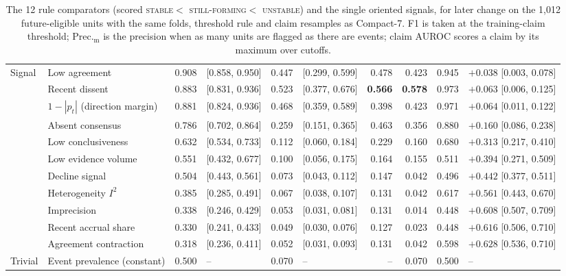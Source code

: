 \documentclass[11pt]{article}
\newcommand{\compact}{Compact-7\xspace}
\newcommand{\stable}{\textsc{stable}\xspace}
\newcommand{\forming}{\textsc{still-forming}\xspace}
\newcommand{\unstable}{\textsc{unstable}\xspace}
\begin{document}
\begin{table}
{\begin{tabular}{@{}llrlrlrrrl@{}}
\midrule
Signal & Low agreement & 0.908 & [0.858, 0.950] & 0.447 & [0.299, 0.599] & 0.478 & 0.423 & 0.945 & $+0.038$ [0.003, 0.078] \\
 & Recent dissent & 0.883 & [0.831, 0.936] & 0.523 & [0.377, 0.676] & \textbf{0.566} & \textbf{0.578} & 0.973 & $+0.063$ [0.006, 0.125] \\
 & $1-|p_t|$ (direction margin) & 0.881 & [0.824, 0.936] & 0.468 & [0.359, 0.589] & 0.398 & 0.423 & 0.971 & $+0.064$ [0.011, 0.122] \\
 & Absent consensus & 0.786 & [0.702, 0.864] & 0.259 & [0.151, 0.365] & 0.463 & 0.356 & 0.880 & $+0.160$ [0.086, 0.238] \\
 & Low conclusiveness & 0.632 & [0.534, 0.733] & 0.112 & [0.060, 0.184] & 0.229 & 0.160 & 0.680 & $+0.313$ [0.217, 0.410] \\
 & Low evidence volume & 0.551 & [0.432, 0.677] & 0.100 & [0.056, 0.175] & 0.164 & 0.155 & 0.511 & $+0.394$ [0.271, 0.509] \\
 & Decline signal & 0.504 & [0.443, 0.561] & 0.073 & [0.043, 0.112] & 0.147 & 0.042 & 0.496 & $+0.442$ [0.377, 0.511] \\
 & Heterogeneity $I^2$ & 0.385 & [0.285, 0.491] & 0.067 & [0.038, 0.107] & 0.131 & 0.042 & 0.617 & $+0.561$ [0.443, 0.670] \\
 & Imprecision & 0.338 & [0.246, 0.429] & 0.053 & [0.031, 0.081] & 0.131 & 0.014 & 0.448 & $+0.608$ [0.507, 0.709] \\
 & Recent accrual share & 0.330 & [0.241, 0.433] & 0.049 & [0.030, 0.076] & 0.127 & 0.023 & 0.448 & $+0.616$ [0.506, 0.710] \\
 & Agreement contraction & 0.318 & [0.236, 0.411] & 0.052 & [0.031, 0.093] & 0.131 & 0.042 & 0.598 & $+0.628$ [0.536, 0.710] \\
\midrule
Trivial & Event prevalence (constant) & 0.500 & -- & 0.070 & -- & -- & 0.070 & 0.500 & -- \\
\bottomrule
\end{tabular}}
\caption{The 12 rule comparators (scored \stable $<$ \forming $<$ \unstable) and the single oriented signals, for later change on the 1{,}012 future-eligible units
with the same folds, threshold rule and claim resamples as \compact. F1 is taken at the
training-claim threshold; Prec.$_{\text{m}}$ is the precision when as many units are flagged as
there are events; claim AUROC scores a claim by its maximum over cutoffs.}
\label{tab:rules}
\end{table}
\end{document}
